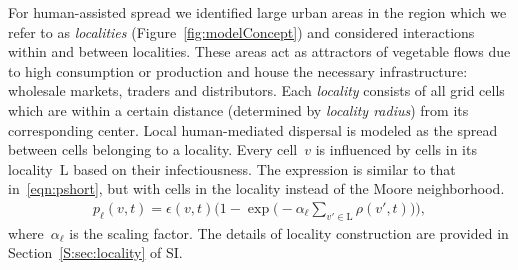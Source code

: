 \documentclass[11pt]{article}
\newcommand{\infest}{\rho}
\newcommand{\suitable}{\epsilon}
\newcommand{\plocal}{p_{\ell}}
\newcommand{\afm}{\alpha_{\ell}}
\newcommand{\locality}{\mathrm{L}}
\theoremstyle{definition}
\begin{document}
For human-assisted spread we identified large urban areas in the region
which we refer to as {\it localities} (Figure~\ref{fig:modelConcept}) and
considered 
interactions within and between localities. These areas act as attractors
of vegetable flows due to high consumption or production and house the necessary
infrastructure: wholesale markets, traders and distributors.
Each
\emph{locality} consists of all grid cells which are within a certain
distance (determined by \emph{locality radius}) from its corresponding center. Local
human-mediated dispersal is modeled as the spread between cells
belonging to a locality.
Every cell~$v$ is influenced by cells in
its locality~$\locality$ based on their infectiousness.  The expression is
similar to that in~\eqref{eqn:pshort}, but with cells in the locality
instead of the Moore neighborhood.
\begin{align}\label{eqn:plocal}
    \plocal(v,t)=\suitable(v,t)\bigg(1-
    \exp\Big(-\afm\sum_{v'\in\locality}\infest(v',t)\Big)\bigg),
\end{align}
where~$\afm$ is the scaling factor. The details of
locality construction are provided in Section~\ref{S:sec:locality} of SI.
\end{document}
